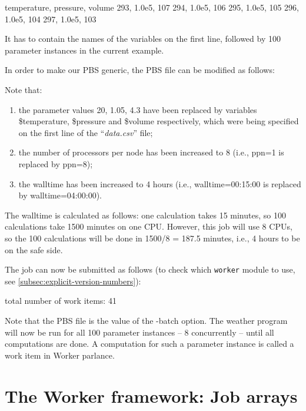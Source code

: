 \begin{prompt}
temperature, pressure, volume
293, 1.0e5, 107
294, 1.0e5, 106
295, 1.0e5, 105
296, 1.0e5, 104
297, 1.0e5, 103
\end{prompt}

It has to contain the names of the variables on the first line, followed by 100
parameter instances in the current example.

In order to make our PBS generic, the PBS file can be modified as follows:


Note that:

\begin{enumerate}
  \item  the parameter values 20, 1.05, 4.3 have been replaced by variables
    \$temperature, \$pressure and \$volume respectively, which were being specified
    on the first line of the ``\emph{data.csv}'' file;
  \item  the number of processors per node has been increased to 8 (i.e., ppn=1 is replaced by
    ppn=8);
  \item  the walltime has been increased to 4 hours (i.e.,
    walltime=00:15:00 is replaced by walltime=04:00:00).
\end{enumerate}

The walltime is calculated as follows: one calculation takes 15 minutes, so 100
calculations take 1500 minutes on one CPU. However, this job will use 8 CPUs,
so the 100 calculations will be done in 1500/8 = 187.5 minutes, i.e., 4 hours
to be on the safe side.

The job can now be submitted as follows (to check which \lstinline|worker| module to use,
see \autoref{subsec:explicit-version-numbers}):

\begin{prompt}
total number of work items: 41
\end{prompt}

Note that the PBS file is the value of the -batch option. The weather program
will now be run for all 100 parameter instances -- 8 concurrently -- until
all computations are done. A computation for such a parameter instance is
called a work item in Worker parlance.

\section{The Worker framework: Job arrays}
\label{sec:worker-framework-job-arrays}

